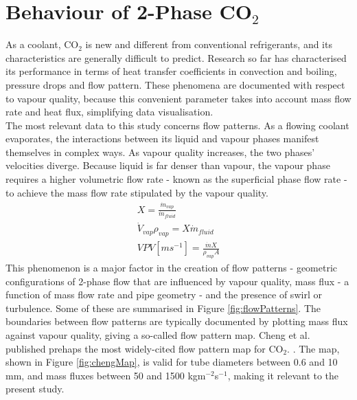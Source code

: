 \documentclass{report}
\begin{document}
\section{Behaviour of 2-Phase CO$_2$} \label{behaviour}
As a coolant, CO$_2$ is new and different from conventional refrigerants, and its characteristics are generally difficult to predict. Research so far has characterised its performance in terms of heat transfer coefficients in convection and boiling, pressure drops and flow pattern.\cite{Mastrullo 2010}\cite{Cheng 2008}\cite{Yun 2005}\cite{Wu 2011} These phenomena are documented with respect to vapour quality, because this convenient parameter takes into account mass flow rate and heat flux, simplifying data visualisation. \\
The most relevant data to this study concerns flow patterns. As a flowing coolant evaporates, the interactions between its liquid and vapour phases manifest themselves in complex ways. As vapour quality increases, the two phases' velocities diverge. Because liquid is far denser than vapour, the vapour phase requires a higher volumetric flow rate - known as the superficial phase flow rate - to achieve the mass flow rate stipulated by the vapour quality. \\
\begin{eqnarray}
X=\frac{\dot{m}_{vap}}{\dot{m}_{fluid}}\\
\dot{V}_{vap}\rho_{vap}=X\dot{m}_{fluid}\\
VPV[ms^{-1}]=\frac{\dot{m}X}{\rho_{vap}A}
\end{eqnarray}
This phenomenon is a major factor in the creation of flow patterns - geometric configurations of 2-phase flow that are influenced by vapour quality, mass flux - a function of mass flow rate and pipe geometry - and the presence of swirl or turbulence. Some of these are summarised in Figure \ref{fig:flowPatterns}. 
\FloatBarrier
The boundaries between flow patterns are typically documented by plotting mass flux against vapour quality, giving a so-called flow pattern map. Cheng et al. published prehaps the most widely-cited flow pattern map for CO$_2$. \cite{Cheng 2008}. The map, shown in Figure \ref{fig:chengMap}, is valid for tube diameters between 0.6 and 10 mm, and mass fluxes between 50 and 1500 kgm$^{-2}$s$^{-1}$, making it relevant to the present study.\\
\end{document}
